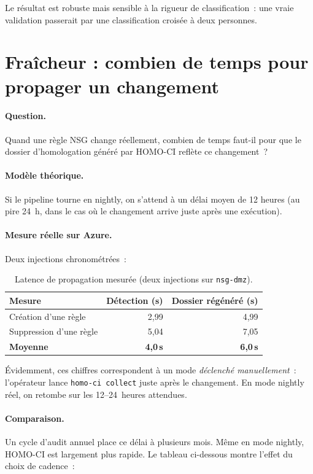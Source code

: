Le résultat est robuste mais sensible à la rigueur de
classification~: une vraie validation passerait par une
classification croisée à deux personnes.

\section{Fraîcheur : combien de temps pour propager un changement}

\paragraph{Question.} Quand une règle NSG change réellement,
combien de temps faut-il pour que le dossier d'homologation
généré par HOMO-CI reflète ce changement~?

\paragraph{Modèle théorique.} Si le pipeline tourne en nightly,
on s'attend à un délai moyen de 12 heures (au pire 24~h, dans le
cas où le changement arrive juste après une exécution).

\paragraph{Mesure réelle sur Azure.}
Deux injections chronométrées~:

\begin{table}[h]
\centering
\caption{Latence de propagation mesurée (deux injections sur
\texttt{nsg-dmz}).}
\label{tab:latence}
\small
\begin{tabular}{lrr}
\toprule
\textbf{Mesure} & \textbf{Détection (s)} & \textbf{Dossier régénéré (s)} \\
\midrule
Création d'une règle & 2,99 & 4,99 \\
Suppression d'une règle & 5,04 & 7,05 \\
\midrule
\textbf{Moyenne} & \textbf{4,0\,s} & \textbf{6,0\,s} \\
\bottomrule
\end{tabular}
\end{table}

Évidemment, ces chiffres correspondent à un mode \emph{déclenché
manuellement}~: l'opérateur lance \texttt{homo-ci collect} juste
après le changement. En mode nightly réel, on retombe sur les
12--24~heures attendues.

\paragraph{Comparaison.} Un cycle d'audit annuel place ce délai à
plusieurs mois. Même en mode nightly, HOMO-CI est largement plus
rapide. Le tableau ci-dessous montre l'effet du choix de
cadence~:

